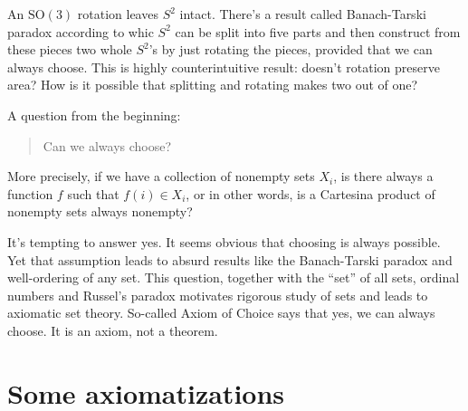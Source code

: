 \documentclass[11pt,oneside,%
]{memoir}
\theoremstyle{definition}
\begin{document}
An \(\mathrm{SO}(3)\) rotation leaves \(S^2\) intact. There's a result called Banach-Tarski paradox according to whic \(S^2\) can be split into five parts and then construct from these pieces two whole \(S^2\)'s by just rotating the pieces, provided that we can always choose. This is highly counterintuitive result: doesn't rotation preserve area? How is it possible that splitting and rotating makes two out of one?

A question from the beginning:
\begin{quote}
    Can we always choose?
\end{quote}
More precisely, if we have a collection of nonempty sets \(X_i\), is there always a function \(f\) such that \(f(i)\in X_i\), or in other words, is a Cartesina product of nonempty sets always nonempty?%

It's tempting to answer yes. It seems obvious that choosing is always possible. Yet that assumption leads to absurd results like the Banach-Tarski paradox and well-ordering of any set. This question, together with the ``set'' of all sets, ordinal numbers and Russel's paradox motivates rigorous study of sets and leads to axiomatic set theory. So-called Axiom of Choice says that yes, we can always choose. It is an axiom, not a theorem.





\section{Some axiomatizations}

\end{document}
